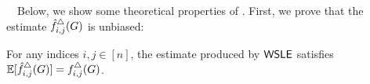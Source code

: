 \smallskip
{}~~Below, we show some theoretical properties of \AlgWSLE{}.
%
First, we prove that
the estimate $\hat{f}_{i,j}^\triangle(G)$
is unbiased:
\begin{theorem}
\label{chap3-thm:unbiased_I}
  For any indices $i,j \in [n]$, the estimate produced by
  $\textsf{WSLE}{}$ satisfies $\operatorname{\mathbb{E}}[\hat{f}_{i,j}^\triangle(G)] = f_{i,j}^\triangle(G)$.
\end{theorem}

